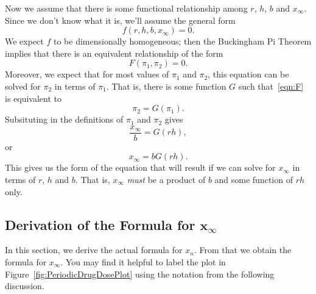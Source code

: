 \documentclass[reqno]{immbook}
\numberwithin{equation}{chapter}
\numberwithin{question}{section}
\numberwithin{theorem}{chapter}
\numberwithin{figure}{chapter}
\theoremstyle{definition}
\begin{document}
Now we assume that there is some functional relationship
among $r$, $h$, $b$ and $x_{\infty}$.  Since we don't know
what it is, we'll assume the general form
\begin{equation}
  f(r,h,b,x_{\infty}) = 0.
\end{equation}
We expect $f$ to be dimensionally homogeneous; then the
Buckingham Pi Theorem implies that there is an equivalent
relationship of the form
\begin{equation}
   F(\pi_1, \pi_2) = 0.
\label{eqn:F}
\end{equation}
Moreover, we expect that for most values of $\pi_1$
and $\pi_2$, this equation can be solved for $\pi_2$
in terms of $\pi_1$. That is, there is some function
$G$ such that~\eqref{eqn:F} is equivalent to
\begin{equation}
   \pi_2 = G(\pi_1).
\end{equation}
Subsituting in the definitions of $\pi_1$ and $\pi_2$ gives
\begin{equation}
   \frac{x_{\infty}}{b} = G(rh),
\end{equation}
or
\begin{equation}
   x_{\infty} = bG(rh).
\end{equation}
This gives us the form of the equation that will result if
we can solve for $x_{\infty}$ in terms of $r$, $h$ and $b$.
That is, $x_{\infty}$ \emph{must} be
a product of $b$ and some function of $rh$ only.
%
%
\subsection*{Derivation of the Formula for $\pmb{x_{\infty}}$}
In this section, we derive the actual formula for
$x_n$. From that we obtain the formula for
$x_{\infty}$.
You may find it helpful to label the plot in
Figure~\ref{fig:PeriodicDrugDosePlot} using the notation
from the following discussion.
\end{document}
